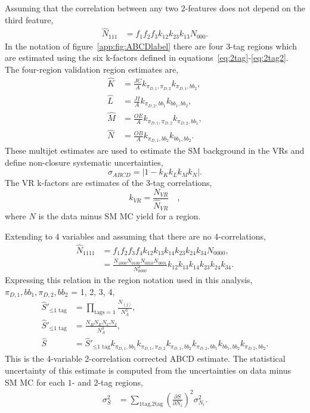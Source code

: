 Assuming that the correlation between any two 2-features does not depend on the third feature,
\begin{align}
  \hat{N}_{111} &= f_1f_2f_3k_{12}k_{23}k_{13}N_{000}.
\end{align}
In the notation of figure~\ref{app:fig:ABCDlabel} there are four 3-tag regions which are estimated using the six k-factors defined in equations~\ref{eq:2tag}-\ref{eq:2tag2}.
The four-region validation region estimates are,
\begin{align}
  \hat{K} &= \frac{JC}{A} k_{\pi_{D,1},\pi_{D,2}}  k_{\pi_{D,1},bb_2},\\
  \hat{L} &= \frac{JI}{A} k_{\pi_{D,2},bb_{1}}  k_{bb_1,bb_2},\\
  \hat{M} &= \frac{OE}{A} k_{\pi_{D,1},\pi_{D,2}}  k_{\pi_{D,2} ,bb_1},\\
  \hat{N} &= \frac{OB}{A} k_{\pi_{D,1},bb_2}  k_{bb_1,bb_2}.                             
\end{align}
These multijet estimates are used to estimate the SM background in the VRs and define non-closure systematic uncertainties,
\begin{equation}
  \sigma_{ABCD} = | 1 - k_K k_L k_M k_N|.
\end{equation}
The VR k-factors are estimates of the 3-tag correlations,
\begin{equation}
  k_{VR} = \frac{N_{VR}}{\hat{N}_{VR}}\quad,
\end{equation}  
where $N$ is the data minus SM MC yield for a region.

Extending to 4 variables and assuming that there are no  4-correlations, 
\begin{align}
  \hat{N}_{1111} &= f_1f_2f_3f_4k_{12}k_{13}k_{14}k_{23}k_{24}k_{34}N_{0000},\\
             &= \frac{N_{1000}N_{0100}N_{0010}N_{0001}}{N_{0000}^3}k_{12}k_{13}k_{14}k_{23}k_{24}k_{34}.
\end{align}
Expressing this relation in the region notation used in this analysis, $\pi_{D,1},bb_1,\pi_{D,2},bb_2$ = 1, 2, 3, 4,
\begin{align}
  \hat{S}'_{\le \text{1 tag}} &= \prod_{\text{tags}=1} \frac{N_{(j)}}{N^3_A},\\
  \hat{S}'_{\le \text{1 tag}} &= \frac{N_BN_EN_CN_I}{N^3_A},\\
  \hat{S} &= \hat{S}'_{\le \text{1 tag}}k_{\pi_{D,1},bb_1} k_{\pi_{D,1},\pi_{D,2}} k_{\pi_{D,1},bb_2} k_{\pi_{D,2},bb_1} k_{bb_1,bb_2} k_{\pi_{D,2},bb_2}.
\end{align}
This is the 4-variable 2-correlation corrected ABCD estimate.
The statistical uncertainty of this estimate is computed from the uncertainties on data minus SM MC for each $1$- and $2$-tag regions,
\begin{align}
  \sigma_S^2 &= \sum_{\text{1tag},\text{2tag}}\left(\frac{\partial{S}}{\partial{N}_i}\right)^2 \sigma^2_{N_i}. 
\end{align}
